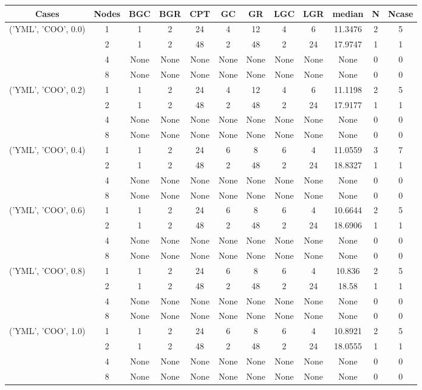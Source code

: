 \begin{tabular}{cccccccccccc}
\hline
Cases & Nodes& BGC& BGR& CPT& GC& GR& LGC& LGR& median & N & Ncase \\
\hline
\multirow{4}{*}{('YML', 'COO', 0.0)}& 1& 1& 2& 24& 4& 12& 4& 6& 11.3476& 2& 5\\
& 2& 1& 2& 48& 2& 48& 2& 24& 17.9747& 1& 1\\
& 4& None& None& None& None& None& None& None& None& 0& 0\\
& 8& None& None& None& None& None& None& None& None& 0& 0\\
\hline
\multirow{4}{*}{('YML', 'COO', 0.2)}& 1& 1& 2& 24& 4& 12& 4& 6& 11.1198& 2& 5\\
& 2& 1& 2& 48& 2& 48& 2& 24& 17.9177& 1& 1\\
& 4& None& None& None& None& None& None& None& None& 0& 0\\
& 8& None& None& None& None& None& None& None& None& 0& 0\\
\hline
\multirow{4}{*}{('YML', 'COO', 0.4)}& 1& 1& 2& 24& 6& 8& 6& 4& 11.0559& 3& 7\\
& 2& 1& 2& 48& 2& 48& 2& 24& 18.8327& 1& 1\\
& 4& None& None& None& None& None& None& None& None& 0& 0\\
& 8& None& None& None& None& None& None& None& None& 0& 0\\
\hline
\multirow{4}{*}{('YML', 'COO', 0.6)}& 1& 1& 2& 24& 6& 8& 6& 4& 10.6644& 2& 5\\
& 2& 1& 2& 48& 2& 48& 2& 24& 18.6906& 1& 1\\
& 4& None& None& None& None& None& None& None& None& 0& 0\\
& 8& None& None& None& None& None& None& None& None& 0& 0\\
\hline
\multirow{4}{*}{('YML', 'COO', 0.8)}& 1& 1& 2& 24& 6& 8& 6& 4& 10.836& 2& 5\\
& 2& 1& 2& 48& 2& 48& 2& 24& 18.58& 1& 1\\
& 4& None& None& None& None& None& None& None& None& 0& 0\\
& 8& None& None& None& None& None& None& None& None& 0& 0\\
\hline
\multirow{4}{*}{('YML', 'COO', 1.0)}& 1& 1& 2& 24& 6& 8& 6& 4& 10.8921& 2& 5\\
& 2& 1& 2& 48& 2& 48& 2& 24& 18.0555& 1& 1\\
& 4& None& None& None& None& None& None& None& None& 0& 0\\
& 8& None& None& None& None& None& None& None& None& 0& 0\\
\hline
\end{tabular}



